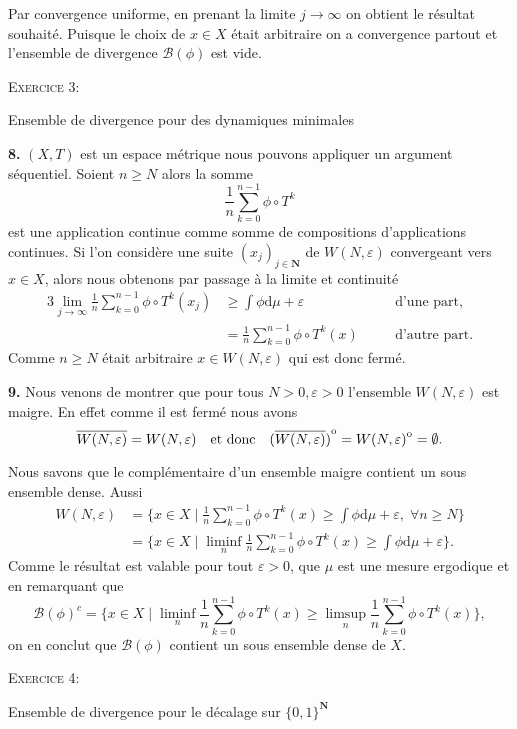 \documentclass[12pt]{article}
\newenvironment{ex}[1]
{\begin{mdframed}[linewidth=0.6pt]
        \textsc{Exercice #1:}

}
    {\end{mdframed}}
\newcommand{\N}{\mathbf{N}}
\newcommand{\de}{\mathrm{d}}
\newcommand{\interior}[1]{%
  {\kern0pt#1}^{\mathrm{o}}%
}
\begin{document}
Par convergence uniforme, en prenant la limite $j \to \infty$ on obtient le résultat souhaité. Puisque le choix de $x \in X$ était arbitraire on a convergence partout et l'ensemble de divergence $\mathcal{B}(\phi)$ est vide.

\bigskip

\begin{ex}{3}
        Ensemble de divergence pour des dynamiques minimales 
\end{ex}

\textbf{8.} $(X,T)$ est un espace métrique nous pouvons appliquer un argument séquentiel. Soient $n \ge N$ alors la somme \[
\frac{1}{n}\sum_{k=0}^{n-1} \phi\circ T^{k}
\] est une application continue comme somme de compositions d'applications continues. Si l'on considère une suite $(x_{j})_{j\in\N}$ de $W(N, \varepsilon)$ convergeant vers $x \in X$, alors nous obtenons par passage à la limite et continuité 
\begin{alignat*}{3}
        \lim_{j\to \infty}\frac{1}{n}\sum_{k=0}^{n-1} \phi\circ T^{k}(x_{j}) &\ge \int\phi\de\mu + \varepsilon \quad &&\text{d'une part,} \\
                                                                             &= \frac{1}{n}\sum_{k=0}^{n-1} \phi\circ T^{k}(x) \quad &&\text{d'autre part}
.\end{alignat*}
Comme $n \ge N$ était arbitraire $x \in W(N,\varepsilon)$ qui est donc fermé.

\bigskip

\textbf{9.} Nous venons de montrer que pour tous $N >0, \varepsilon > 0$ l'ensemble $W(N,\varepsilon)$ est maigre. En effet comme il est fermé nous avons  \[
        \overline{W(N,\varepsilon)} = W(N,\varepsilon) \quad \text{et donc} \quad \interior{(\overline{W(N,\varepsilon)})} = \interior{W(N,\varepsilon)} = \emptyset 
.\] 

Nous savons que le complémentaire d'un ensemble maigre contient un sous ensemble dense. Aussi
\begin{align*}
        W(N, \varepsilon) &= \{x\in X \;|\; \frac{1}{n}\sum_{k=0}^{n-1} \phi\circ T^{k}(x) \ge \int\phi\de\mu + \varepsilon, \; \forall n \ge N\} \\
                          &= \{x \in X \;|\; \liminf_{n} \frac{1}{n}\sum_{k=0}^{n-1} \phi\circ T^{k}(x) \ge \int\phi\de\mu + \varepsilon\}
.\end{align*}
Comme le résultat est valable pour tout $\varepsilon > 0$, que $\mu$ est une mesure ergodique et en remarquant que  \[
        \mathcal{B}(\phi)^{c} = \{x\in X \;|\; \liminf_{n}\frac{1}{n}\sum_{k=0}^{n-1} \phi\circ T^{k}(x) \ge \limsup_{n} \frac{1}{n}\sum_{k=0}^{n-1} \phi\circ T^{k}(x)\} 
,\] on en conclut que $\mathcal{B}(\phi)$ contient un sous ensemble dense de $X$. 


\bigskip

\begin{ex}{4}
       Ensemble de divergence pour le décalage sur $\{0,1\}^{\N}$ 
\end{ex}
\end{document}
